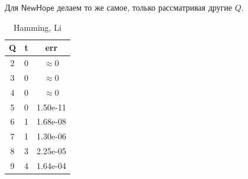 Для $\mathsf{NewHope}$ делаем то же самое, только рассматривая другие $Q$.

\begin{table}[h]
	\centering
	\begin{tabular}{|c|c|c|}
		\hline Q & t & err \\ \hline
		2 & 0 & $\approx 0$ \\ \hline
		3 & 0 & $\approx 0$ \\ \hline
		4 & 0 & $\approx 0$ \\ \hline
		5 & 0 & 1.50e-11 \\ \hline
		6 & 1 & 1.68e-08 \\ \hline
		7 & 1 & 1.30e-06 \\ \hline
		8 & 3 & 2.25e-05 \\ \hline
		9 & 4 & 1.64e-04 \\ \hline
	\end{tabular}
	\caption*{Hamming, Li}
	

\end{table}
